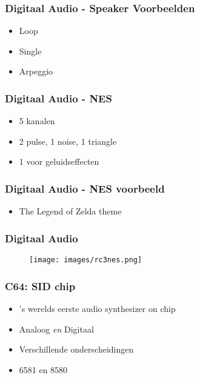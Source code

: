 \begin{frame}
\frametitle{Digitaal Audio - Speaker Voorbeelden}

\begin{itemize}
\item Loop
\item Single
\item Arpeggio
\end{itemize}

\end{frame}


\begin{frame}
\frametitle{Digitaal Audio - NES}

\begin{itemize}
\item 5 kanalen
\item 2 pulse, 1 noise, 1 triangle
\item 1 voor geluidseffecten
\end{itemize}

\end{frame}


\begin{frame}
\frametitle{Digitaal Audio - NES voorbeeld}

\begin{itemize}
\item The Legend of Zelda theme
\end{itemize}

\end{frame}


\begin{frame}
\frametitle{Digitaal Audio}

\begin{figure}
\texttt{[image: images/rc3nes.png]}
\end{figure}

\end{frame}


\begin{frame}
\frametitle{C64: SID chip}

\begin{itemize}
\item 's werelds eerste audio synthesizer on chip
\item Analoog \emph{en} Digitaal
\item Verschillende onderscheidingen
\item 6581 en 8580
\end{itemize}

\end{frame}

